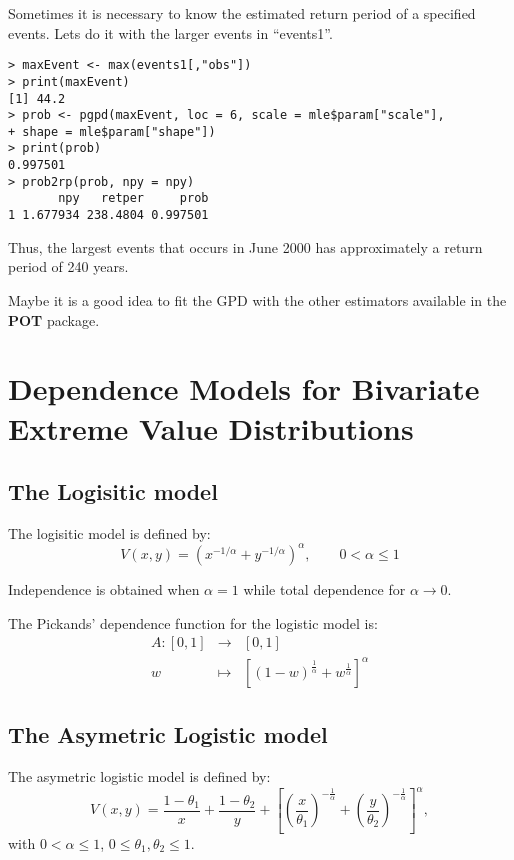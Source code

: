 \documentclass[11pt,a4paper]{article}
\numberwithin{equation}{section}
\theoremstyle{definition}
\begin{document}
Sometimes it is necessary to know the estimated return period of a
specified events. Lets do it with the larger events in ``events1''.
\begin{verbatim}
> maxEvent <- max(events1[,"obs"])
> print(maxEvent)
[1] 44.2
> prob <- pgpd(maxEvent, loc = 6, scale = mle$param["scale"],
+ shape = mle$param["shape"])
> print(prob)
0.997501 
> prob2rp(prob, npy = npy)
       npy   retper     prob
1 1.677934 238.4804 0.997501
\end{verbatim}
Thus, the largest events that occurs in June 2000 has approximately a
return period of 240 years.

Maybe it is a good idea to fit the GPD with the other estimators
available in the \textbf{POT} package.

\appendix

\section{Dependence Models for Bivariate Extreme Value
  Distributions}
\label{sec:copula}

\subsection{The Logisitic model}

The logisitic model is defined by:
\begin{equation}
  \label{eq:logistic}
  V(x,y) = \left( x^{-1/\alpha} + y^{-1/\alpha} \right)^\alpha, \qquad
  0 < \alpha \leq 1 
\end{equation}

Independence is obtained when $\alpha = 1$ while total dependence for
$\alpha \rightarrow 0$.

The Pickands' dependence function for the logistic model is:
\begin{eqnarray*}
  A: \left[0,1\right] &\longrightarrow& \left[0,1\right]\\
  w &\longmapsto& \left[\left(1-w\right)^\frac{1}{\alpha} +
    w^\frac{1}{\alpha} \right]^\alpha
\end{eqnarray*}

\subsection{The Asymetric Logistic model}

The asymetric logistic model is defined by:
\begin{displaymath}
  V(x,y) = \frac{1 - \theta_1}{x} + \frac{1 - \theta_2}{y} + \left[
    \left(\frac{x}{\theta_1} \right)^{-\frac{1}{\alpha}} +
      \left(\frac{y}{\theta_2} \right)^{-\frac{1}{\alpha}}
    \right]^\alpha,
\end{displaymath}
with $0 < \alpha \leq 1$, $0 \leq \theta_1, \theta_2 \leq 1$.
\end{document}
